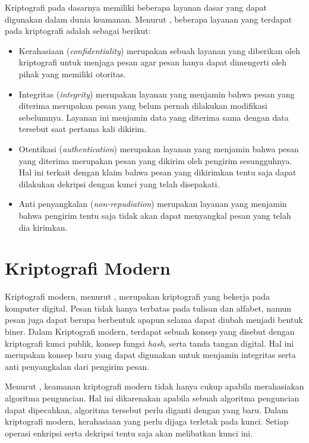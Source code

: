 Kriptografi pada dasarnya memiliki beberapa layanan dasar yang dapat digunakan dalam dunia keamanan. Menurut \textcite{schneier1996}, beberapa layanan yang terdapat pada kriptografi adalah sebagai berikut:
\begin{itemize}
  \item Kerahasiaan (\emph{confidentiality}) merupakan sebuah layanan yang diberikan oleh kriptografi untuk menjaga pesan agar pesan hanya dapat dimengerti oleh pihak yang memiliki otoritas. 
  \item Integritas (\emph{integrity}) merupakan layanan yang menjamin bahwa pesan yang diterima merupakan pesan yang belum pernah dilakukan modifikasi sebelumnya. Layanan ini menjamin data yang diterima sama dengan data tersebut saat pertama kali dikirim.
  \item Otentikasi (\emph{authentication}) merupakan layanan yang menjamin bahwa pesan yang diterima merupakan pesan yang dikirim oleh pengirim sesungguhnya. Hal ini terkait dengan klaim bahwa pesan yang dikirimkan tentu saja dapat dilakukan dekripsi dengan kunci yang telah disepakati.
  \item Anti penyangkalan (\emph{non-repudiation}) merupakan layanan yang menjamin bahwa pengirim tentu saja tidak akan dapat menyangkal pesan yang telah dia kirimkan.
\end{itemize} 

\section{Kriptografi Modern}
Kriptografi modern, menurut \textcite{munir2019}, merupakan kriptografi yang bekerja pada komputer digital. Pesan tidak hanya terbatas pada tulisan dan alfabet, namun pesan juga dapat berupa berbentuk apapun selama dapat diubah menjadi bentuk biner. Dalam Kriptografi modern, terdapat sebuah konsep yang disebut dengan kriptografi kunci publik, konsep fungsi \emph{hash}, serta tanda tangan digital. Hal ini merupakan konsep baru yang dapat digunakan untuk menjamin integritas serta anti penyangkalan dari pengirim pesan.

Menurut \textcite{schneier1996}, keamanan kriptografi modern tidak hanya cukup apabila merahasiakan algoritma penguncian. Hal ini dikarenakan apabila sebuah algoritma penguncian dapat dipecahkan, algoritma tersebut perlu diganti dengan yang baru. Dalam kriptografi modern, kerahasiaan yang perlu dijaga terletak pada kunci. Setiap operasi enkripsi serta dekripsi tentu saja akan melibatkan kunci ini. 

